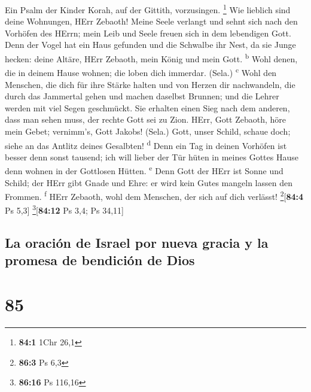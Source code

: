  Ein Psalm der Kinder Korah, auf der Gittith, vorzusingen.
\footnote{\textbf{84:1} 1Chr 26,1}  Wie lieblich sind
deine Wohnungen, HErr Zebaoth!  Meine Seele verlangt und
sehnt sich nach den Vorhöfen des HErrn; mein Leib und Seele freuen sich
in dem lebendigen Gott.  Denn der Vogel hat ein Haus
gefunden und die Schwalbe ihr Nest, da sie Junge hecken: deine Altäre,
HErr Zebaoth, mein König und mein Gott. \textsuperscript{b}
 Wohl denen, die in deinem Hause wohnen; die loben dich
immerdar. (Sela.) \textsuperscript{c}  Wohl den Menschen,
die dich für ihre Stärke halten und von Herzen dir nachwandeln,
 die durch das Jammertal gehen und machen daselbst
Brunnen; und die Lehrer werden mit viel Segen geschmückt. 
Sie erhalten einen Sieg nach dem anderen, dass man sehen muss, der
rechte Gott sei zu Zion.  HErr, Gott Zebaoth, höre mein
Gebet; vernimm's, Gott Jakobs! (Sela.)  Gott, unser
Schild, schaue doch; siehe an das Antlitz deines Gesalbten!
\textsuperscript{d}  Denn ein Tag in deinen Vorhöfen ist
besser denn sonst tausend; ich will lieber der Tür hüten in meines
Gottes Hause denn wohnen in der Gottlosen Hütten. \textsuperscript{e}
 Denn Gott der HErr ist Sonne und Schild; der HErr gibt
Gnade und Ehre: er wird kein Gutes mangeln lassen den Frommen.
\textsuperscript{f}  HErr Zebaoth, wohl dem Menschen, der
sich auf dich verlässt! \footnote{\textbf{86:3} Ps 6,3}{[}\textbf{84:4}
Ps 5,3{]} \footnote{\textbf{86:16} Ps 116,16}{[}\textbf{84:12} Ps 3,4;
Ps 34,11{]}

\hypertarget{la-oraciuxf3n-de-israel-por-nueva-gracia-y-la-promesa-de-bendiciuxf3n-de-dios}{%
\subsection{La oración de Israel por nueva gracia y la promesa de
bendición de
Dios}\label{la-oraciuxf3n-de-israel-por-nueva-gracia-y-la-promesa-de-bendiciuxf3n-de-dios}}

\hypertarget{section-84}{%
\section{85}\label{section-84}}

